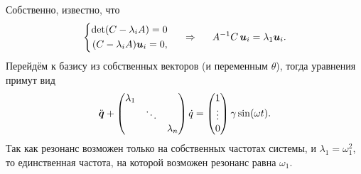 Собственно, известно, что
\begin{equation*}
    \left\{\begin{aligned}
        \det (C - \lambda_i A) = 0 \\
        (C - \lambda_i A) \mbox{\boldmath $u$}_i = 0,
    \end{aligned}\right.
    \hspace{0.5cm} \Rightarrow \hspace{0.5cm}   
    A^{-1} C \, \mbox{\boldmath $u$}_i = \lambda_1 \mbox{\boldmath $u$}_i.
\end{equation*}
Перейдём к базису из собственных векторов (и переменным $\theta$), тогда уравнения примут вид
\begin{equation*}
    \ddot{\mbox{\boldmath $q$}} + \begin{pmatrix}
        \lambda_1 &  &  \\
         & \ddots &  \\
         &  & \lambda_n \\
    \end{pmatrix} \dot{q} = \begin{pmatrix}
        1 \\ \vdots \\ 0
    \end{pmatrix} \gamma \sin (\omega t).
\end{equation*}
Так как резонанс возможен только на собственных частотах системы, и $\lambda_1 = \omega_1^2$, то единственная частота, на которой возможен резонанс равна $\omega_1$.
